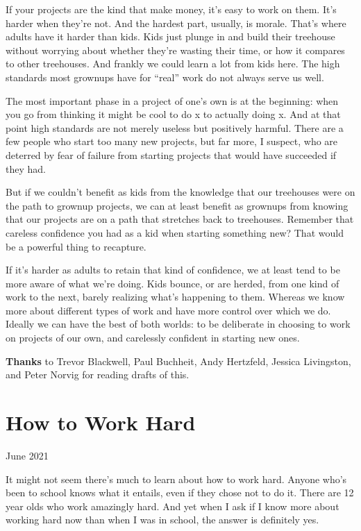 \documentclass[12pt]{book}
\begin{document}
If your projects are the kind that make money, it's easy to work on
them. It's harder when they're not. And the hardest part, usually, is
morale. That's where adults have it harder than kids. Kids just plunge
in and build their treehouse without worrying about whether they're
wasting their time, or how it compares to other treehouses. And frankly
we could learn a lot from kids here. The high standards most grownups
have for ``real'' work do not always serve us well.

The most important phase in a project of one's own is at the beginning:
when you go from thinking it might be cool to do x to actually doing x.
And at that point high standards are not merely useless but positively
harmful. There are a few people who start too many new projects, but far
more, I suspect, who are deterred by fear of failure from starting
projects that would have succeeded if they had.

But if we couldn't benefit as kids from the knowledge that our
treehouses were on the path to grownup projects, we can at least benefit
as grownups from knowing that our projects are on a path that stretches
back to treehouses. Remember that careless confidence you had as a kid
when starting something new? That would be a powerful thing to
recapture.

If it's harder as adults to retain that kind of confidence, we at least
tend to be more aware of what we're doing. Kids bounce, or are herded,
from one kind of work to the next, barely realizing what's happening to
them. Whereas we know more about different types of work and have more
control over which we do. Ideally we can have the best of both worlds:
to be deliberate in choosing to work on projects of our own, and
carelessly confident in starting new ones.


\textbf{Thanks} to Trevor Blackwell, Paul Buchheit, Andy Hertzfeld,
Jessica Livingston, and Peter Norvig for reading drafts of this.
\chapter{How to Work Hard}

June 2021

It might not seem there's much to learn about how to work hard. Anyone
who's been to school knows what it entails, even if they chose not to do
it. There are 12 year olds who work amazingly hard. And yet when I ask
if I know more about working hard now than when I was in school, the
answer is definitely yes.
\end{document}
